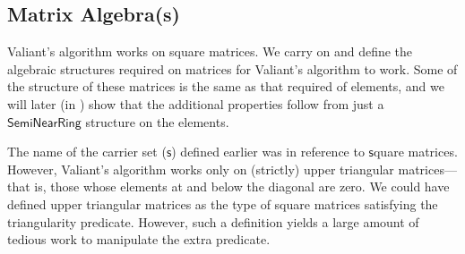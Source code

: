 \documentclass{CSML}
\numberwithin{theorem}{section}
\newcommand{\Conid}[1]{\mathit{#1}}
\newcommand{\Varid}[1]{\mathit{#1}}
\renewcommand\Varid[1]{\ensuremath{\mathsf{#1}}}
\renewcommand\Conid[1]{\ensuremath{\mathsf{#1}}}
\begin{document}
\subsection{Matrix Algebra(s)}
Valiant's algorithm works on square matrices.
We carry on and define the algebraic structures required on matrices
for Valiant's algorithm to work.
Some of the structure of these matrices is the same as that required
of elements, and we will later (in ) show that the
additional properties follow from just a \ensuremath{\Conid{SemiNearRing}} structure on
the elements.


The name of the carrier set (\ensuremath{\Varid{s}}) defined earlier was in reference to
\ensuremath{\Varid{s}}quare matrices.
However, Valiant's algorithm works only on (strictly) upper triangular
matrices--- that is, those whose elements at and below the diagonal
are zero.
We could have defined upper triangular matrices as the type of square
matrices satisfying the triangularity predicate. However, such a definition yields a large amount of tedious work to
manipulate the extra predicate.
\end{document}
